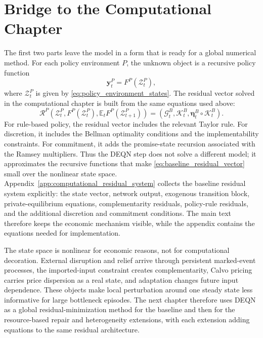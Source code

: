 ﻿\documentclass[12pt]{article}
\theoremstyle{remark}
\newcommand{\E}{\mathbb E}
\begin{document}
\section{Bridge to the Computational Chapter}

The first two parts leave the model in a form that is ready for a global numerical method. For each
policy environment $P$, the unknown object is a recursive policy function
\begin{equation}
    \mathbf y_t^P
    =
    F^P(\mathcal Z_t^P),
    \label{eq:recursive_policy_function_for_deqn}
\end{equation}
where $\mathcal Z_t^P$ is given by \eqref{eq:policy_environment_states}. The residual vector solved
in the computational chapter is built from the same equations used above:
\begin{equation}
    \mathcal R^P
    \left(
        \mathcal Z_t^P,
        F^P(\mathcal Z_t^P),
        \E_tF^P(\mathcal Z_{t+1}^P)
    \right)
    =
    \left(
        \mathcal G^B_t,
        \mathcal K^B_t,
        \boldsymbol\eta_t^B\circ\mathcal K^B_t
    \right).
    \label{eq:baseline_residual_vector}
\end{equation}
For rule-based policy, the residual vector includes the relevant Taylor rule. For discretion, it
includes the Bellman optimality conditions and the implementability constraints. For commitment, it
adds the promise-state recursion associated with the Ramsey multipliers. Thus the DEQN step does
not solve a different model; it approximates the recursive functions that make
\eqref{eq:baseline_residual_vector} small over the nonlinear state space.
Appendix~\ref{app:computational_residual_system} collects the baseline residual system explicitly:
the state vector, network output, exogenous transition block, private-equilibrium equations,
complementarity residuals, policy-rule residuals, and the additional discretion and commitment
conditions. The main text therefore keeps the economic mechanism visible, while the appendix
contains the equations needed for implementation.

The state space is nonlinear for economic reasons, not for computational decoration. External
disruption and relief arrive through persistent marked-event processes, the imported-input
constraint creates complementarity, Calvo pricing carries price dispersion as a real state, and
adaptation changes future input dependence. These objects make local perturbation around one steady
state less informative for large bottleneck episodes. The next chapter therefore uses DEQN as a
global residual-minimization method for the baseline and then for the resource-based repair and
heterogeneity extensions, with each extension adding equations to the same residual architecture.
\end{document}
